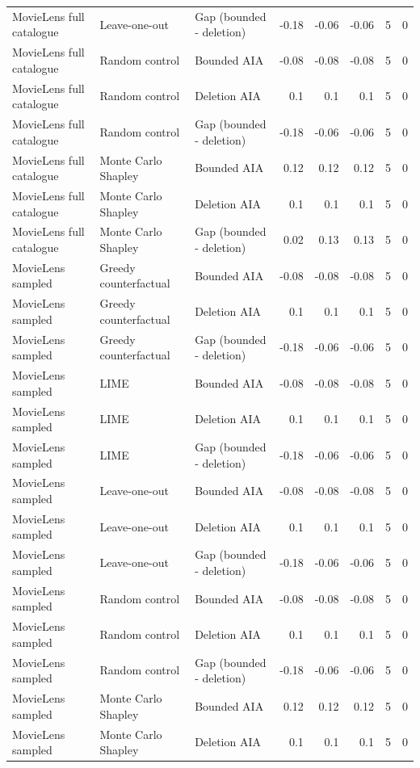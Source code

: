 \begin{table}[t]
{\begin{tabular}{lllrrrrr}
MovieLens full catalogue & Leave-one-out & Gap (bounded - deletion) & -0.18 & -0.06 & -0.06 & 5 & 0 \\
MovieLens full catalogue & Random control & Bounded AIA & -0.08 & -0.08 & -0.08 & 5 & 0 \\
MovieLens full catalogue & Random control & Deletion AIA & 0.1 & 0.1 & 0.1 & 5 & 0 \\
MovieLens full catalogue & Random control & Gap (bounded - deletion) & -0.18 & -0.06 & -0.06 & 5 & 0 \\
MovieLens full catalogue & Monte Carlo Shapley & Bounded AIA & 0.12 & 0.12 & 0.12 & 5 & 0 \\
MovieLens full catalogue & Monte Carlo Shapley & Deletion AIA & 0.1 & 0.1 & 0.1 & 5 & 0 \\
MovieLens full catalogue & Monte Carlo Shapley & Gap (bounded - deletion) & 0.02 & 0.13 & 0.13 & 5 & 0 \\
MovieLens sampled & Greedy counterfactual & Bounded AIA & -0.08 & -0.08 & -0.08 & 5 & 0 \\
MovieLens sampled & Greedy counterfactual & Deletion AIA & 0.1 & 0.1 & 0.1 & 5 & 0 \\
MovieLens sampled & Greedy counterfactual & Gap (bounded - deletion) & -0.18 & -0.06 & -0.06 & 5 & 0 \\
MovieLens sampled & LIME & Bounded AIA & -0.08 & -0.08 & -0.08 & 5 & 0 \\
MovieLens sampled & LIME & Deletion AIA & 0.1 & 0.1 & 0.1 & 5 & 0 \\
MovieLens sampled & LIME & Gap (bounded - deletion) & -0.18 & -0.06 & -0.06 & 5 & 0 \\
MovieLens sampled & Leave-one-out & Bounded AIA & -0.08 & -0.08 & -0.08 & 5 & 0 \\
MovieLens sampled & Leave-one-out & Deletion AIA & 0.1 & 0.1 & 0.1 & 5 & 0 \\
MovieLens sampled & Leave-one-out & Gap (bounded - deletion) & -0.18 & -0.06 & -0.06 & 5 & 0 \\
MovieLens sampled & Random control & Bounded AIA & -0.08 & -0.08 & -0.08 & 5 & 0 \\
MovieLens sampled & Random control & Deletion AIA & 0.1 & 0.1 & 0.1 & 5 & 0 \\
MovieLens sampled & Random control & Gap (bounded - deletion) & -0.18 & -0.06 & -0.06 & 5 & 0 \\
MovieLens sampled & Monte Carlo Shapley & Bounded AIA & 0.12 & 0.12 & 0.12 & 5 & 0 \\
MovieLens sampled & Monte Carlo Shapley & Deletion AIA & 0.1 & 0.1 & 0.1 & 5 & 0 \\

\end{tabular}}
\end{table}
